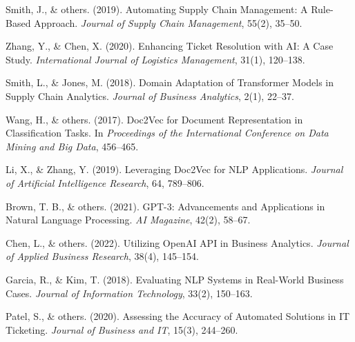 \documentclass[11pt]{article}
\begin{document}
\begin{thebibliography}{}

Smith, J., \& others. (2019).
\newblock Automating Supply Chain Management: A Rule-Based Approach.
\newblock \emph{Journal of Supply Chain Management}, 55(2), 35--50.

Zhang, Y., \& Chen, X. (2020).
\newblock Enhancing Ticket Resolution with AI: A Case Study.
\newblock \emph{International Journal of Logistics Management}, 31(1), 120--138.

Smith, L., \& Jones, M. (2018).
\newblock Domain Adaptation of Transformer Models in Supply Chain Analytics.
\newblock \emph{Journal of Business Analytics}, 2(1), 22--37.

Wang, H., \& others. (2017).
\newblock Doc2Vec for Document Representation in Classification Tasks.
\newblock In \emph{Proceedings of the International Conference on Data Mining and Big Data}, 456--465.

Li, X., \& Zhang, Y. (2019).
\newblock Leveraging Doc2Vec for NLP Applications.
\newblock \emph{Journal of Artificial Intelligence Research}, 64, 789--806.

Brown, T. B., \& others. (2021).
\newblock GPT-3: Advancements and Applications in Natural Language Processing.
\newblock \emph{AI Magazine}, 42(2), 58--67.

Chen, L., \& others. (2022).
\newblock Utilizing OpenAI API in Business Analytics.
\newblock \emph{Journal of Applied Business Research}, 38(4), 145--154.

Garcia, R., \& Kim, T. (2018).
\newblock Evaluating NLP Systems in Real-World Business Cases.
\newblock \emph{Journal of Information Technology}, 33(2), 150--163.

Patel, S., \& others. (2020).
\newblock Assessing the Accuracy of Automated Solutions in IT Ticketing.
\newblock \emph{Journal of Business and IT}, 15(3), 244--260.

\end{thebibliography}
\end{document}
